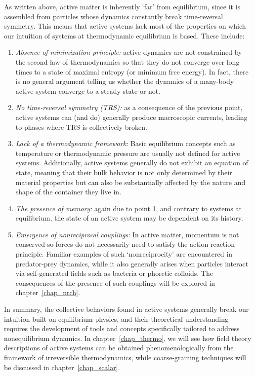 As written above, active matter is inherently `far' from equilibrium, since it is assembled from particles whose dynamics constantly break time-reversal symmetry. This means that active systems lack most of the properties on which our intuition of systems at thermodynamic equilibrium is based. These include:
%
\begin{enumerate}
    \item \textit{Absence of minimization principle:} active dynamics are not constrained by the second law of thermodynamics so that they do not converge over long times to a state of maximal entropy (or minimum free energy). In fact, there is no general argument telling us whether the dynamics of a many-body active system converge to a steady state or not.
    \item \textit{No time-reversal symmetry (TRS):} as a consequence of the previous point, active systems can (and do) generally produce macroscopic currents, leading to phases where TRS is collectively broken.
    \item \textit{Lack of a thermodynamic framework:} Basic equilibrium concepts such as temperature or thermodynamic pressure are usually not defined for active systems. Additionally, active systems generally do not exhibit an equation of state, meaning that their bulk behavior is not only determined by their material properties but can also be substantially affected by the nature and shape of the container they live in. 
    \item \textit{The presence of memory:} again due to point 1, and contrary to systems at equilibrium, the state of an active system may be dependent on its history.
    \item \textit{Emergence of nonreciprocal couplings:} In active matter, momentum is not conserved so forces do not necessarily need to satisfy the action-reaction principle. Familiar examples of such `nonreciprocity' are encountered in predator-prey dynamics, while it also generally arises when particles interact via self-generated fields such as bacteria or phoretic colloids.
    The consequences of the presence of such couplings will be explored in chapter~\ref{chap_nrch}.
\end{enumerate}
%
In summary, the collective behaviors found in active systems generally break our intuition built on equilibrium physics, and their theoretical understanding requires the development of tools and concepts specifically tailored to address nonequilibrium dynamics.
In chapter~\ref{chap_thermo}, we will see how field theory descriptions of active systems can be obtained phenomenologically from the framework of irreversible thermodynamics, while coarse-graining techniques will be discussed in chapter~\ref{chap_scalar}.


